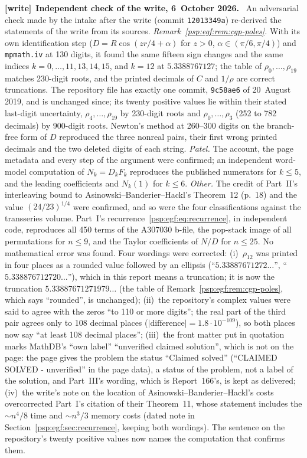 \documentclass[11pt,letterpaper]{article}
\numberwithin{equation}{section}
\theoremstyle{remark}\newtheorem{remark}[theorem]{Remark}
\newcommand{\file}[1]{\nolinkurl{#1}}
\newenvironment{writenote}[1][]{\par\smallskip\begingroup\small
 \noindent\textbf{[write]}\if\relax\detokenize{#1}\relax\else~\textbf{#1.}\fi\ }%
 {\par\endgroup\smallskip}
\begin{document}
\begin{writenote}[Independent check of the write, 6~October 2026]
An adversarial check made by the intake after the write (commit
\file{12013349a}) re-derived the statements of the write from its sources.
\emph{Remark~\ref{psp:egf:rem:cgp-poles}.} With its own identification step
($D=R\cos(zr/4+\alpha)$ for $z>0$, $\alpha\in(\pi/6,\pi/4)$) and
\texttt{mpmath.iv} at 130 digits, it found the same fifteen sign changes and the
same indices $k=0,\dots,11,13,14,15$, and $k=12$ at $5.3388767127$; the table
of $\rho_0,\dots,\rho_{19}$ matches 230-digit roots, and the printed decimals of
$C$ and $1/\rho$ are correct truncations. The repository file \cite{repo} has
exactly one commit, \file{9c58ae6} of 20~August 2019, and is unchanged since;
its twenty positive values lie within their stated last-digit uncertainty,
$\rho_4,\dots,\rho_{19}$ by 230-digit roots and $\rho_0,\dots,\rho_3$ (252 to 782
decimals) by 900-digit roots. Newton's method at 260--300 digits on the
branch-free form of $D$ reproduced the three nonreal pairs, their first wrong
printed decimals and the two deleted digits of each string. \emph{Patel.} The
account, the page metadata and every step of the argument were confirmed; an
independent word-model computation of $N_k=D_kF_k$ reproduces the published
numerators for $k\le5$, and the leading coefficients and $N_k(1)$ for $k\le6$.
\emph{Other.} The credit of Part~II's interleaving bound to
Asinowski--Banderier--Hackl's Theorem~12 (p.~18) and the value
$(24/23)^{1/4}$ were confirmed, and so were the four classifications against the
transseries volume. Part~I's recurrence~\eqref{psp:egf:eq:recurrence}, in
independent code, reproduces all 450 terms of the A307030 b-file, the pop-stack
image of all permutations for $n\le9$, and the Taylor coefficients of $N/D$ for
$n\le25$. No mathematical error was found. Four wordings were corrected:
(i)~$\rho_{12}$ was printed in four places as a rounded value followed by an
ellipsis (``$5.33887671272\ldots$'', ``$5.338876712720\ldots$''), which in this
report means a truncation; it is now the truncation $5.33887671271979\ldots$
(the table of Remark~\ref{psp:egf:rem:cgp-poles}, which says ``rounded'', is
unchanged); (ii)~the repository's complex values were said to agree with the
zeros ``to 110 or more digits''; the real part of the third pair agrees only to
108 decimal places ($|\text{difference}|=1.8\cdot10^{-109}$), so both places now
say ``at least 108 decimal places''; (iii)~the front matter put in quotation
marks MathDB's ``own label'' ``unverified claimed solution'', which is not on
the page: the page gives the problem the status ``Claimed solved''
(``CLAIMED SOLVED - unverified'' in the page data), a status of the problem,
not a label of the solution, and Part~III's wording, which is Report~166's, is
kept as delivered; (iv)~the write's note on the location of
Asinowski--Banderier--Hackl's costs overcorrected Part~I's citation of their
Theorem~11, whose statement includes the $\sim n^4/8$ time and $\sim n^3/3$
memory costs (dated note in Section~\ref{psp:egf:sec:recurrence}, keeping both
wordings). The sentence on the repository's twenty positive values now names
the computation that confirms them.
\end{writenote}
\end{document}
